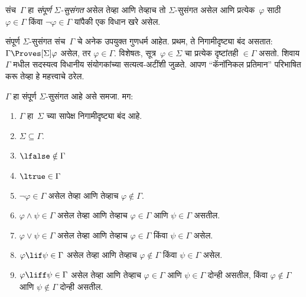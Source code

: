\begin{defn}
  संच~$\Gamma$ हा \emph{संपूर्ण $\Sigma$-सुसंगत}
  असेल तेव्हा आणि तेव्हाच तो $\Sigma$-सुसंगत
  असेल आणि प्रत्येक~$\varphi$ साठी
  $\varphi \in \Gamma$ किंवा $\lnot \varphi \in \Gamma$
  यांपैकी एक विधान खरे असेल.
\end{defn}

संपूर्ण $\Sigma$-सुसंगत संच~$\Gamma$ चे अनेक
उपयुक्त गुणधर्म आहेत. प्रथम, ते निगामीदृष्ट्या
बंद असतात: $\Gamma
\Proves[\Sigma] \varphi$ असेल, तर $\varphi \in \Gamma$.
विशेषतः, सूत्र~$\varphi \in \Sigma$ चा प्रत्येक
दृष्टांतही $\in
\Gamma$ असतो. शिवाय $\Gamma$ मधील सदस्यत्व
विधानीय संयोगकांच्या सत्यत्व-अटींशी जुळते.
आपण ``कॅनॉनिकल प्रतिमान'' परिभाषित करू तेव्हा
हे महत्त्वाचे ठरेल.

\begin{prop}\label{nml:com:ccs:prop:ccs-properties}
  $\Gamma$ हा संपूर्ण $\Sigma$-सुसंगत आहे असे
  समजा. मग:
  \begin{enumerate}
  \item \label{nml:com:ccs:prop:ccs-closed}
    $\Gamma$ हा~$\Sigma$ च्या सापेक्ष
    निगामीदृष्ट्या बंद आहे.
  \item \label{nml:com:ccs:prop:ccs-sigma}
    $\Sigma \subseteq \Gamma$.
  \item \label{nml:com:ccs:prop:ccs-lfalse}
    $\lfalse \notin \Gamma$
  \item \label{nml:com:ccs:prop:ccs-ltrue}
    $\ltrue \in \Gamma$
  \item \label{nml:com:ccs:prop:ccs-lnot}
    $\lnot\varphi \in \Gamma$ असेल तेव्हा आणि
    तेव्हाच $\varphi \notin
    \Gamma$.
  \item \label{nml:com:ccs:prop:ccs-land}
    $\varphi \land \psi \in \Gamma$ असेल तेव्हा आणि तेव्हाच
    $\varphi \in \Gamma$ आणि $\psi \in \Gamma$ असतील.
  \item \label{nml:com:ccs:prop:ccs-lor}
    $\varphi \lor \psi \in \Gamma$ असेल तेव्हा आणि तेव्हाच
    $\varphi \in \Gamma$ किंवा $\psi \in \Gamma$ असेल.
  \item \label{nml:com:ccs:prop:ccs-lif}
    $\varphi \lif \psi \in \Gamma$ असेल तेव्हा आणि तेव्हाच
    $\varphi \notin \Gamma$ किंवा $\psi \in \Gamma$ असेल.
  \item \label{nml:com:ccs:prop:ccs-liff}
    $\varphi \liff \psi \in \Gamma$ असेल तेव्हा आणि तेव्हाच
    $\varphi \in \Gamma$ आणि $\psi \in
    \Gamma$ दोन्ही असतील, किंवा
    $\varphi \notin \Gamma$ आणि $\psi \notin \Gamma$
    दोन्ही असतील.
  \end{enumerate}
\end{prop}

